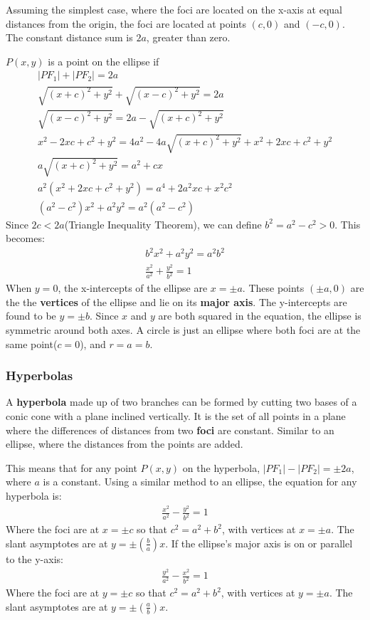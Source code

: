 \documentclass{article}
\begin{document}
Assuming the simplest case, where the foci are located on the x-axis at equal distances from the origin, the foci are located at points $(c,0)$ and $(-c,0)$. The constant distance sum is $2a$, greater than zero.

$P(x,y)$  is a point on the ellipse if
\begin{gather*}
    |PF_1| + |PF_2| = 2a\\
    \sqrt{(x+c)^2 + y^2} + \sqrt{(x-c)^2 + y^2} = 2a\\
    \sqrt{(x-c)^2 + y^2} = 2a - \sqrt{(x+c)^2 + y^2}\\
    x^2 - 2xc + c^2 + y^2 = 4a^2 - 4a\sqrt{(x+c)^2 + y^2} + x^2 + 2xc + c^2 + y^2\\
    a\sqrt{(x+c)^2+y^2} = a^2 + cx\\
    a^2(x^2 + 2xc + c^2 + y^2) = a^4 + 2a^2xc + x^2c^2\\
    (a^2 - c^2)x^2 + a^2y^2 = a^2(a^2-c^2)
\end{gather*}
Since $2c < 2a$(Triangle Inequality Theorem), we can define $b^2 = a^2 - c^2 > 0$. This becomes:
\begin{gather*}
    b^2x^2 + a^2y^2 = a^2b^2\\
    \frac{x^2}{a^2} + \frac{y^2}{b^2} = 1
\end{gather*}
When $y = 0$, the x-intercepts of the ellipse are $x = \pm a$. These points $(\pm a,0)$ are the the \textbf{vertices} of the ellipse and lie on its \textbf{major axis}. The y-intercepts are found to be $y = \pm b$. Since $x$ and $y$ are both squared in the equation, the ellipse is symmetric around both axes. A circle is just an ellipse where both foci are at the same point($c = 0$), and $r = a = b$.
\subsubsection{Hyperbolas}
A \textbf{hyperbola} made up of two branches can be formed by cutting two bases of a conic cone with a plane inclined vertically. It is the set of all points in a plane where the differences of distances from two \textbf{foci} are constant. Similar to an ellipse, where the distances from the points are added.

This means that for any point $P(x,y)$ on the hyperbola, $|PF_1| - |PF_2| = \pm 2a$, where $a$ is a constant. Using a similar method to an ellipse, the equation for any hyperbola is:
\begin{gather*}
    \frac{x^2}{a^2} - \frac{y^2}{b^2} = 1
\end{gather*}
Where the foci are at $x = \pm c$ so that $c^2 = a^2 + b^2$, with vertices at $x = \pm a$. The slant asymptotes are at $y = \pm (\frac{b}{a})x$. If the ellipse's major axis is on or parallel to the y-axis:
\begin{gather*}
    \frac{y^2}{a^2} - \frac{x^2}{b^2} = 1
\end{gather*}
Where the foci are at $y = \pm c$ so that $c^2 = a^2 + b^2$, with vertices at $y = \pm a$. The slant asymptotes are at $y = \pm (\frac{a}{b})x$.
\end{document}
